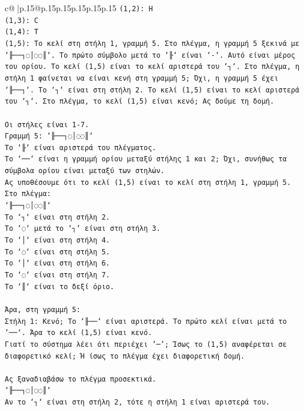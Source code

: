 \documentclass{article}
\begin{document}
{\begin{supertabular}{c@{$\;$}|p{.15\linewidth}@{}p{.15\linewidth}p{.15\linewidth}p{.15\linewidth}p{.15\linewidth}p{.15\linewidth}}
{{{\texttt{(1,2): H} \\
\texttt{(1,3): C} \\
\texttt{(1,4): T} \\
\texttt{(1,5): Το κελί στη στήλη 1, γραμμή 5. Στο πλέγμα, η γραμμή 5 ξεκινά με `╟──┐◌│◌◌║`. Το πρώτο σύμβολο μετά το `╟` είναι `{-}`. Αυτό είναι μέρος του ορίου. Το κελί (1,5) είναι το κελί αριστερά του `┐`. Στο πλέγμα, η στήλη 1 φαίνεται να είναι κενή στη γραμμή 5; Όχι, η γραμμή 5 έχει `╟──┐`. Το `┐` είναι στη στήλη 2. Το κελί (1,5) είναι το κελί αριστερά του `┐`. Στο πλέγμα, το κελί (1,5) είναι κενό; Ας δούμε τη δομή.} \\
\\ 
\texttt{Οι στήλες είναι 1{-}7.} \\
\texttt{Γραμμή 5: `╟──┐◌│◌◌║`} \\
\texttt{Το `╟` είναι αριστερά του πλέγματος.} \\
\texttt{Το `──` είναι η γραμμή ορίου μεταξύ στήλης 1 και 2; Όχι, συνήθως τα σύμβολα ορίου είναι μεταξύ των στηλών.} \\
\texttt{Ας υποθέσουμε ότι το κελί (1,5) είναι το κελί στη στήλη 1, γραμμή 5.} \\
\texttt{Στο πλέγμα:} \\
\texttt{`╟──┐◌│◌◌║`} \\
\texttt{Το `┐` είναι στη στήλη 2.} \\
\texttt{Το `◌` μετά το `┐` είναι στη στήλη 3.} \\
\texttt{Το `│` είναι στη στήλη 4.} \\
\texttt{Το `◌` είναι στη στήλη 5.} \\
\texttt{Το `│` είναι στη στήλη 6.} \\
\texttt{Το `◌` είναι στη στήλη 7.} \\
\texttt{Το `║` είναι το δεξί όριο.} \\
\\ 
\texttt{Άρα, στη γραμμή 5:} \\
\texttt{Στήλη 1: Κενό; Το `╟──` είναι αριστερά. Το πρώτο κελί είναι μετά το `──`. Άρα το κελί (1,5) είναι κενό.} \\
\texttt{Γιατί το σύστημα λέει ότι περιέχει '─'; Ίσως το (1,5) αναφέρεται σε διαφορετικό κελί; Ή ίσως το πλέγμα έχει διαφορετική δομή.} \\
\\ 
\texttt{Ας ξαναδιαβάσω το πλέγμα προσεκτικά.} \\
\texttt{`╟──┐◌│◌◌║`} \\
\texttt{Αν το `┐` είναι στη στήλη 2, τότε η στήλη 1 είναι αριστερά του.} \\
}}}
\end{supertabular}}
\end{document}
